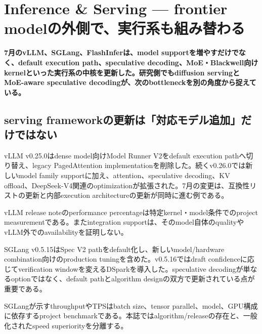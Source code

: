 \section{Inference \& Serving — frontier modelの外側で、実行系も組み替わる}
\noindent\textbf{7月のvLLM、SGLang、FlashInferは、model supportを増やすだけでなく、default execution path、speculative decoding、MoE・Blackwell向けkernelといった実行系の中核を更新した。研究側でもdiffusion servingとMoE-aware speculative decodingが、次のbottleneckを別の角度から捉えている。}\autocite{src-50e29a09d75a,src-5a9041d41ad0,src-76c7b104c7df,src-b80517d03022}

\subsection{serving frameworkの更新は「対応モデル追加」だけではない}

vLLM v0.25.0はdense model向けModel Runner V2をdefault execution pathへ切り替え、legacy PagedAttention implementationを削除した。続くv0.26.0では新しいmodel family supportに加え、attention、speculative decoding、KV offload、DeepSeek-V4関連のoptimizationが拡張された。7月の変更は、互換性リストの更新と内部execution architectureの更新が同時に進む例である。\autocite{src-76c7b104c7df,src-b811cc97eff4}


\begin{claimboundary}
vLLM release noteのperformance percentageは特定kernel・model条件でのproject measurementである。またintegration supportは、そのmodel自体のqualityやvLLM外でのavailabilityを証明しない。\autocite{src-76c7b104c7df,src-b811cc97eff4}
\end{claimboundary}

SGLang v0.5.15はSpec V2 pathをdefault化し、新しいmodel/hardware combination向けのproduction tuningを含めた。v0.5.16ではdraft confidenceに応じてverification windowを変えるDSparkを導入した。speculative decodingが単なるoptionではなく、default pathとalgorithm designの双方で更新されている点が重要である。\autocite{src-5a9041d41ad0,src-bf2a6d1b9b56}


\begin{claimboundary}
SGLangが示すthroughputやTPSはbatch size、tensor parallel、model、GPU構成に依存するproject benchmarkである。本誌ではalgorithm/releaseの存在と、一般化されたspeed superiorityを分離する。\autocite{src-5a9041d41ad0,src-bf2a6d1b9b56}
\end{claimboundary}

